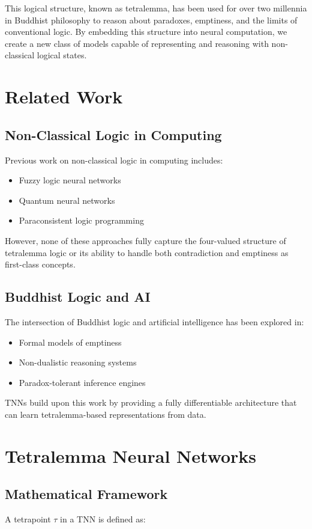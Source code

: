 \documentclass[10pt,journal,compsoc]{IEEEtran}
\begin{document}
This logical structure, known as tetralemma, has been used for over two millennia in Buddhist philosophy to reason about paradoxes, emptiness, and the limits of conventional logic. By embedding this structure into neural computation, we create a new class of models capable of representing and reasoning with non-classical logical states.

\section{Related Work}
\subsection{Non-Classical Logic in Computing}
Previous work on non-classical logic in computing includes:
\begin{itemize}
\item Fuzzy logic neural networks \cite{fuzzy}
\item Quantum neural networks \cite{quantum}
\item Paraconsistent logic programming \cite{para}
\end{itemize}

However, none of these approaches fully capture the four-valued structure of tetralemma logic or its ability to handle both contradiction and emptiness as first-class concepts.

\subsection{Buddhist Logic and AI}
The intersection of Buddhist logic and artificial intelligence has been explored in:
\begin{itemize}
\item Formal models of emptiness \cite{empty}
\item Non-dualistic reasoning systems \cite{nondual}
\item Paradox-tolerant inference engines \cite{paradox}
\end{itemize}

TNNs build upon this work by providing a fully differentiable architecture that can learn tetralemma-based representations from data.

\section{Tetralemma Neural Networks}
\subsection{Mathematical Framework}
A tetrapoint $\tau$ in a TNN is defined as:
\end{document}
